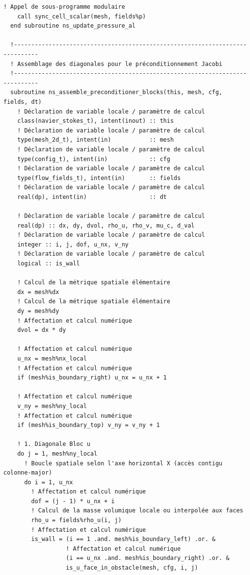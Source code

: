 \documentclass[10pt,a4paper,oneside]{book}
\begin{document}
\begin{lstlisting}[language={[95]Fortran}]
    ! Appel de sous-programme modulaire
    call sync_cell_scalar(mesh, fields%p)
  end subroutine ns_update_pressure_al

  !-----------------------------------------------------------------------------
  ! Assemblage des diagonales pour le préconditionnement Jacobi
  !-----------------------------------------------------------------------------
  subroutine ns_assemble_preconditioner_blocks(this, mesh, cfg, fields, dt)
    ! Déclaration de variable locale / paramètre de calcul
    class(navier_stokes_t), intent(inout) :: this
    ! Déclaration de variable locale / paramètre de calcul
    type(mesh_2d_t), intent(in)           :: mesh
    ! Déclaration de variable locale / paramètre de calcul
    type(config_t), intent(in)            :: cfg
    ! Déclaration de variable locale / paramètre de calcul
    type(flow_fields_t), intent(in)       :: fields
    ! Déclaration de variable locale / paramètre de calcul
    real(dp), intent(in)                  :: dt

    ! Déclaration de variable locale / paramètre de calcul
    real(dp) :: dx, dy, dvol, rho_u, rho_v, mu_c, d_val
    ! Déclaration de variable locale / paramètre de calcul
    integer :: i, j, dof, u_nx, v_ny
    ! Déclaration de variable locale / paramètre de calcul
    logical :: is_wall

    ! Calcul de la métrique spatiale élémentaire
    dx = mesh%dx
    ! Calcul de la métrique spatiale élémentaire
    dy = mesh%dy
    ! Affectation et calcul numérique
    dvol = dx * dy

    ! Affectation et calcul numérique
    u_nx = mesh%nx_local
    ! Affectation et calcul numérique
    if (mesh%is_boundary_right) u_nx = u_nx + 1

    ! Affectation et calcul numérique
    v_ny = mesh%ny_local
    ! Affectation et calcul numérique
    if (mesh%is_boundary_top) v_ny = v_ny + 1

    ! 1. Diagonale Bloc u
    do j = 1, mesh%ny_local
      ! Boucle spatiale selon l'axe horizontal X (accès contigu colonne-major)
      do i = 1, u_nx
        ! Affectation et calcul numérique
        dof = (j - 1) * u_nx + i
        ! Calcul de la masse volumique locale ou interpolée aux faces
        rho_u = fields%rho_u(i, j)
        ! Affectation et calcul numérique
        is_wall = (i == 1 .and. mesh%is_boundary_left) .or. &
                  ! Affectation et calcul numérique
                  (i == u_nx .and. mesh%is_boundary_right) .or. &
                  is_u_face_in_obstacle(mesh, cfg, i, j)


\end{lstlisting}
\end{document}

